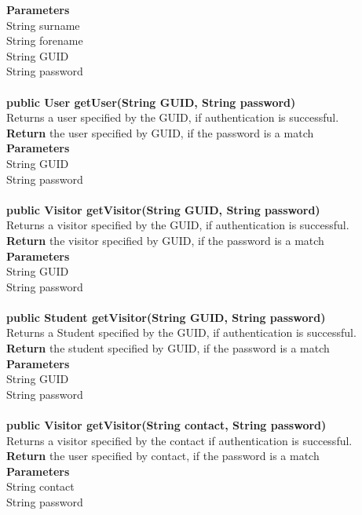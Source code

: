 \documentclass{l3deliverable}
\begin{document}
\textbf{Parameters}\\
String surname\\
String forename\\
String GUID\\
String password\\
\\
\textbf{public User getUser(String GUID, String password)}\\
Returns a user specified by the GUID, if authentication is successful.\\
\textbf{Return} the user specified by GUID, if the password is a match\\
\textbf{Parameters}\\
String GUID\\
String password\\
\\
\textbf{public Visitor getVisitor(String GUID, String password)}\\
Returns a visitor specified by the GUID, if authentication is successful.\\
\textbf{Return} the visitor specified by GUID, if the password is a match\\
\textbf{Parameters}\\
String GUID\\
String password\\
\\
\textbf{public Student getVisitor(String GUID, String password)}\\
Returns a Student specified by the GUID, if authentication is successful.\\
\textbf{Return} the student specified by GUID, if the password is a match\\
\textbf{Parameters}\\
String GUID\\
String password\\
\\
\textbf{public Visitor getVisitor(String contact, String password)}\\
Returns a visitor specified by the contact if authentication is successful.\\
\textbf{Return} the user specified by contact, if the password is a match\\
\textbf{Parameters}\\
String contact\\
String password\\
\\
\end{document}
